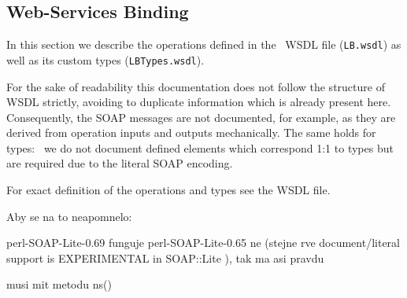 \subsection{Web-Services Binding}\label{s:Consumer-API-WS}


In this section we describe the operations defined in the \LB\ WSDL
file (\texttt{LB.wsdl}) as well as its custom types (\texttt{LBTypes.wsdl}).

For the sake of readability this documentation does not follow the structure
of WSDL strictly, avoiding to duplicate information which is already present
here. Consequently, the SOAP messages are not documented, for example, as they
are derived from operation inputs and outputs mechanically.
The same holds for types: \eg\ we do not document defined elements
which correspond 1:1 to types but are required due to the literal SOAP
encoding.

For exact definition of the operations and types see the WSDL file.



Aby se na to neapomnelo:

perl-SOAP-Lite-0.69 funguje
perl-SOAP-Lite-0.65 ne 	(stejne rve document/literal support is EXPERIMENTAL in SOAP::Lite ), tak ma asi pravdu


musi mit metodu ns()

